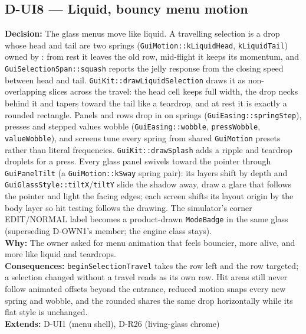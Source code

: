 \subsection*{D-UI8 --- Liquid, bouncy menu motion}
\begin{decisionbox}[title={D-UI8 \quad 2026-09-23}]
\textbf{Decision:} The glass menus move like liquid. A travelling selection
is a drop whose head and tail are two springs
(\texttt{GuiMotion::kLiquidHead}, \texttt{kLiquidTail}) owned by
: from rest it leaves the old row, mid-flight it
keeps its momentum, and \texttt{GuiSelectionSpan::squash} reports the jelly
response from the closing speed between head and tail.
\texttt{GuiKit::drawLiquidSelection} draws it as non-overlapping slices across
the travel: the head cell keeps full width, the drop necks behind it and
tapers toward the tail like a teardrop, and at rest it is exactly a rounded
rectangle. Panels and rows drop in on springs
(\texttt{GuiEasing::springStep}), presses and stepped values wobble
(\texttt{GuiEasing::wobble}, \texttt{pressWobble}, \texttt{valueWobble}), and
screens tune every spring from shared \texttt{GuiMotion} presets rather than
literal frequencies. \texttt{GuiKit::drawSplash} adds a ripple and teardrop
droplets for a press. Every glass panel swivels toward the pointer through
\texttt{GuiPanelTilt} (a \texttt{GuiMotion::kSway} spring pair): its layers
shift by depth and \texttt{GuiGlassStyle::tiltX}/\texttt{tiltY} slide the
shadow away, draw a glare that follows the pointer and light the facing
edges; each screen shifts its layout origin by the body layer so hit testing
follows the drawing. The simulator's corner EDIT/NORMAL label becomes a
product-drawn \texttt{ModeBadge} in the same glass (superseding D-OWN1's
 member; the engine class stays).\\
\textbf{Why:} The owner asked for menu animation that feels bouncier, more
alive, and more like liquid and teardrops.\\
\textbf{Consequences:} \texttt{beginSelectionTravel} takes the row left and
the row targeted; a selection changed without a travel reads as its own row.
Hit areas still never follow animated offsets beyond the entrance, reduced
motion snaps every new spring and wobble, and the rounded
 shares the same drop horizontally while its flat style
is unchanged.\\
\textbf{Extends:} D-UI1 (menu shell), D-R26 (living-glass chrome)
\end{decisionbox}

